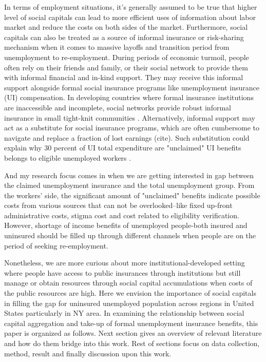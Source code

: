 \documentclass{article}
\begin{document}
In terms of employment situations, it's generally assumed to be true that higher level of social capitals can lead to more efficient uses of information about labor market and reduce the costs on both sides of the market. Furthermore, social capitals can also be treated as a source of informal insurance or risk-sharing mechanism when it comes to massive layoffs and transition period from unemployment to re-employment. During periods of economic turmoil, people often rely on their friends and family, or their social network to provide them with informal financial and in-kind support. They may receive this informal support alongside formal social insurance programs like unemployment insurance (UI) compensation. In developing countries where formal insurance institutions are inaccessible and incomplete, social networks provide robust informal insurance in small tight-knit communities \cite{microfinance}. Alternatively, informal support may act as a substitute for social insurance programs, which are often cumbersome to navigate and replace a fraction of lost earnings (cite). Such substitution could explain why 30 percent of UI total expenditure are "unclaimed" UI benefits belongs to eligible unemployed workers \cite{gap_takeup}.

And my research focus comes in when we are getting interested in gap between the claimed unemployment insurance and the total unemployment group. From the workers' side, the significant amount of "unclaimed" benefits indicate possible costs from various sources that can not be overlooked--like fixed up-front administrative costs, stigma cost and cost related to eligibility verification. However, shortage of income benefits of unemployed people-both insured and uninsured should be filled up through different channels when people are on the period of seeking re-employment. 


Nonetheless, we are more curious about more institutional-developed setting where people have access to public insurances through institutions but still manage or obtain resources through social capital accumulations when costs of the public resources are high. Here we envision the importance of social capitals in filling the gap for uninsured unemployed population across regions in United States particularly in NY area. In examining the relationship between social capital aggregation and take-up of formal unemployment insurance benefits, this paper is organized as follows. Next section gives an overview of relevant literature and how do them bridge into this work. Rest of sections focus on data collection, method, result and finally discussion upon this work.
\end{document}
